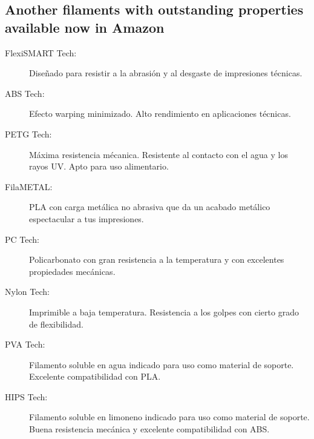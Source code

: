 \documentclass[11pt,a4paper]{article}
\begin{document}
\subsection{Another filaments with outstanding properties available now in Amazon}
\begin{description}
\item[FlexiSMART Tech:] Diseñado para resistir a la abrasión y al desgaste de impresiones técnicas. 
\item[ABS Tech:] Efecto warping minimizado. Alto rendimiento en aplicaciones técnicas. 
\item[PETG Tech:] Máxima resistencia mécanica. Resistente al contacto con el agua y los rayos UV. Apto para uso alimentario. 
\item[FilaMETAL:] PLA con carga metálica no abrasiva que da un acabado metálico espectacular a tus impresiones. 
\item[PC Tech:] Policarbonato con gran resistencia a la temperatura y con excelentes propiedades mecánicas. 
\item[Nylon Tech:] Imprimible a baja temperatura. Resistencia a los golpes con cierto grado de flexibilidad. 
\item[PVA Tech:] Filamento soluble en agua indicado para uso como material de soporte. Excelente compatibilidad con PLA. 
\item[HIPS Tech:] Filamento soluble en limoneno indicado para uso como material de soporte. Buena resistencia mecánica y excelente compatibilidad con ABS. 
\end{description}

\end{document}
